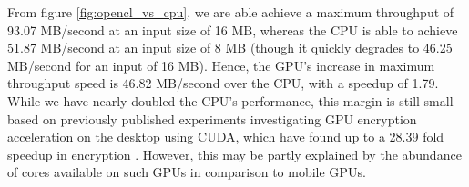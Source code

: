 \documentclass[conference,10pt]{IEEEtran}
\begin{document}
From figure \ref{fig:opencl_vs_cpu}, we are able achieve a maximum throughput of 93.07 MB/second at an 
input size of 16 MB, whereas the CPU is able to achieve 51.87 MB/second at an input size of 8 MB (though it 
quickly degrades to 46.25 MB/second for an input of 16 MB).  Hence, the GPU's increase in maximum 
throughput speed is 46.82 MB/second over the CPU, with a speedup of 1.79.  While we have nearly doubled the 
CPU's performance, this margin is still small based on previously published experiments investigating GPU 
encryption acceleration on the desktop using CUDA, which have found up to a 28.39 fold speedup in 
encryption \cite{aes_cuda}.  However, this may be partly explained by the abundance of cores available on 
such GPUs in comparison to mobile GPUs.



%
%


%
\end{document}
